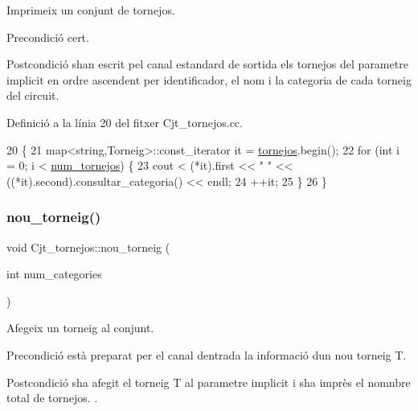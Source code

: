 Imprimeix un conjunt de tornejos. 

\begin{DoxyPrecond}{Precondició}
cert. 
\end{DoxyPrecond}
\begin{DoxyPostcond}{Postcondició}
s\textquotesingle{}han escrit pel canal estandard de sortida els tornejos del parametre implicit en ordre ascendent per identificador, el nom i la categoria de cada torneig del circuit. 
\end{DoxyPostcond}


Definició a la línia 20 del fitxer Cjt\+\_\+tornejos.\+cc.


\begin{DoxyCode}
20                                      \{
21     map<string,Torneig>::const\_iterator it = \mbox{\hyperlink{class_cjt__tornejos_a4b3d9bdd2ed133d76284fb510ebe9800}{tornejos}}.begin();
22     \textcolor{keywordflow}{for} (\textcolor{keywordtype}{int} i = 0; i < \mbox{\hyperlink{class_cjt__tornejos_afe968dc02bf4f83842c53c5a76182f2f}{num\_tornejos}}) \{
23         cout < (*it).first << \textcolor{stringliteral}{" "} << ((*it).second).consultar\_categoria() << endl;
24         ++it;
25     \}
26 \}
\end{DoxyCode}
\mbox{\label{class_cjt__tornejos_ac4298fab4f5ed1d33c762dd837f50b8a}} 
\subsubsection{\texorpdfstring{nou\+\_\+torneig()}{nou\_torneig()}}
{\footnotesize\ttfamily void Cjt\+\_\+tornejos\+::nou\+\_\+torneig (\begin{DoxyParamCaption}\item[{int}]{num\+\_\+categories }\end{DoxyParamCaption})}



Afegeix un torneig al conjunt. 

\begin{DoxyPrecond}{Precondició}
està preparat per el canal d\textquotesingle{}entrada la informació d\textquotesingle{}un nou torneig T. 
\end{DoxyPrecond}
\begin{DoxyPostcond}{Postcondició}
s\textquotesingle{}ha afegit el torneig T al parametre implicit i s\textquotesingle{}ha imprès el nomnbre total de tornejos. . 
\end{DoxyPostcond}


